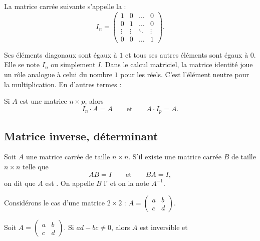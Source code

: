 \documentclass[11pt,class=report,crop=false]{standalone}
\begin{document}
La matrice carrée suivante s'appelle la  :
 \[
 I_n = \left(
 \begin{array}{cccc}
1 & 0 & \dots & 0\\
0& 1& \dots & 0\\
 \vdots& \vdots & \ddots  & \vdots\\
0 & 0 & \dots &1
\end{array}
\right).
 \]

Ses éléments diagonaux sont égaux à $1$ et tous ses autres éléments sont égaux à $0$.
Elle se note $I_n$ ou simplement $I$.
Dans le calcul matriciel, la matrice identité joue un rôle
analogue à celui du nombre $1$ pour les réels.
C'est l'élément neutre pour la multiplication. En
d'autres termes :

\begin{proposition}
Si $A$ est une matrice $n \times p$, alors
$$ I_n \cdot A = A \qquad \text{et} \qquad A \cdot I_p = A.$$
\end{proposition}


\subsection{Matrice inverse, déterminant}

\begin{definition}
Soit $A$ une matrice  carrée de taille $n \times n$. S'il existe une matrice carrée
$B$ de taille $n \times n$ telle que
$$ AB = I\qquad \text{et} \qquad BA = I,$$
on dit que $A$ est . 
On appelle $B$ l' et on la note $A^{-1}$.
\end{definition}

Considérons le cas d'une matrice $2\times 2$ :
$A = \begin{pmatrix}
 a & b\\
 c & d
\end{pmatrix}.
$
\begin{proposition}
Soit $A = \begin{pmatrix}
 a & b\\
 c & d
\end{pmatrix}
$.
Si $ad - bc \not= 0$,  alors $A$ est inversible et
\end{proposition}
\end{document}
